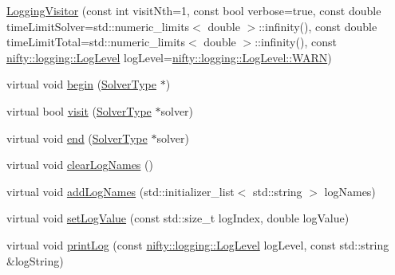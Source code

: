 \begin{DoxyCompactItemize}
\item 
\hyperlink{classnifty_1_1graph_1_1opt_1_1common_1_1LoggingVisitor_a4c800001aaba274d08b3284b373844a2}{Logging\+Visitor} (const int visit\+Nth=1, const bool verbose=true, const double time\+Limit\+Solver=std\+::numeric\+\_\+limits$<$ double $>$\+::infinity(), const double time\+Limit\+Total=std\+::numeric\+\_\+limits$<$ double $>$\+::infinity(), const \hyperlink{namespacenifty_1_1logging_a3385625f9a0dbb17f70c47d3fca2f64d}{nifty\+::logging\+::\+Log\+Level} log\+Level=\hyperlink{namespacenifty_1_1logging_a3385625f9a0dbb17f70c47d3fca2f64da32bd8a1db2275458673903bdb84cb277}{nifty\+::logging\+::\+Log\+Level\+::\+W\+A\+RN})
\item 
virtual void \hyperlink{classnifty_1_1graph_1_1opt_1_1common_1_1LoggingVisitor_a5ab79ee5e4afe5e7af570c64b1678dbc}{begin} (\hyperlink{classnifty_1_1graph_1_1opt_1_1common_1_1LoggingVisitor_af6aa5fbf9acd4c1fa02fa34c73b90c1b}{Solver\+Type} $\ast$)
\item 
virtual bool \hyperlink{classnifty_1_1graph_1_1opt_1_1common_1_1LoggingVisitor_a0079f597f09fae363906092f00df126b}{visit} (\hyperlink{classnifty_1_1graph_1_1opt_1_1common_1_1LoggingVisitor_af6aa5fbf9acd4c1fa02fa34c73b90c1b}{Solver\+Type} $\ast$solver)
\item 
virtual void \hyperlink{classnifty_1_1graph_1_1opt_1_1common_1_1LoggingVisitor_a8597af1625d5499fa13c1890d92052a0}{end} (\hyperlink{classnifty_1_1graph_1_1opt_1_1common_1_1LoggingVisitor_af6aa5fbf9acd4c1fa02fa34c73b90c1b}{Solver\+Type} $\ast$solver)
\item 
virtual void \hyperlink{classnifty_1_1graph_1_1opt_1_1common_1_1LoggingVisitor_a84dd33facd4e7b509e5d311f2e94df1a}{clear\+Log\+Names} ()
\item 
virtual void \hyperlink{classnifty_1_1graph_1_1opt_1_1common_1_1LoggingVisitor_a19ea135ecf8fbc92a8a7792164c4fd44}{add\+Log\+Names} (std\+::initializer\+\_\+list$<$ std\+::string $>$ log\+Names)
\item 
virtual void \hyperlink{classnifty_1_1graph_1_1opt_1_1common_1_1LoggingVisitor_a2e4db3bf347a0f6eae52d2b66c341935}{set\+Log\+Value} (const std\+::size\+\_\+t log\+Index, double log\+Value)
\item 
virtual void \hyperlink{classnifty_1_1graph_1_1opt_1_1common_1_1LoggingVisitor_a516caf5c8a5c5378ef5d5d62d920142c}{print\+Log} (const \hyperlink{namespacenifty_1_1logging_a3385625f9a0dbb17f70c47d3fca2f64d}{nifty\+::logging\+::\+Log\+Level} log\+Level, const std\+::string \&log\+String)

\end{DoxyCompactItemize}
